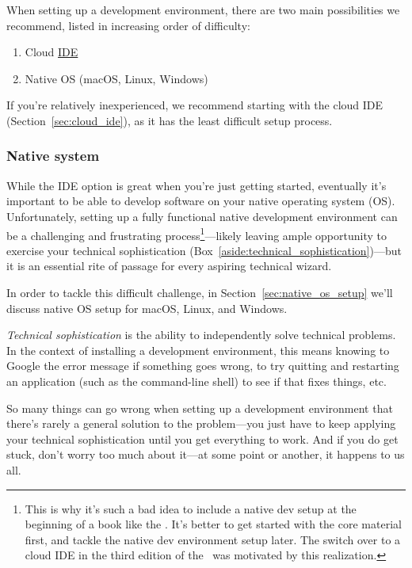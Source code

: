 When setting up a development environment, there are two main possibilities we recommend, listed in increasing order of difficulty:

\begin{enumerate}
  \item Cloud \href{https://en.wikipedia.org/wiki/Integrated_development_environment}{IDE}
  \item Native OS (macOS, Linux, Windows)
\end{enumerate}

If you're relatively inexperienced, we recommend starting with the cloud IDE (Section~\ref{sec:cloud_ide}), as it has the least difficult setup process.

\subsubsection{Native system} %
\label{sec:native_system}

While the IDE option is great when you're just getting started, eventually it's important to be able to develop software on your native operating system (OS)\@. Unfortunately, setting up a fully functional native development environment can be a challenging and frustrating process\footnote{This is why it's such a bad idea to include a native dev setup at the beginning of a book like the \rortb. It's better to get started with the core material first, and tackle the native dev environment setup later. The switch over to a cloud IDE in the third edition of the \rortb\ was motivated by this realization.}---likely leaving ample opportunity to exercise your technical sophistication (Box~\ref{aside:technical_sophistication})---but it is an essential rite of passage for every aspiring technical wizard.

In order to tackle this difficult challenge, in Section~\ref{sec:native_os_setup} we'll discuss native OS setup for macOS, Linux, and Windows.

\begin{aside}
\label{aside:technical_sophistication}

\emph{Technical sophistication} is the ability to independently solve technical problems. In the context of installing a development environment, this means knowing to Google the error message if something goes wrong, to try quitting and restarting an application (such as the command-line shell) to see if that fixes things, etc.

So many things can go wrong when setting up a development environment that there's rarely a general solution to the problem---you just have to keep applying your technical sophistication until you get everything to work. And if you do get stuck, don't worry too much about it---at some point or another, it happens to us all.

\end{aside}

